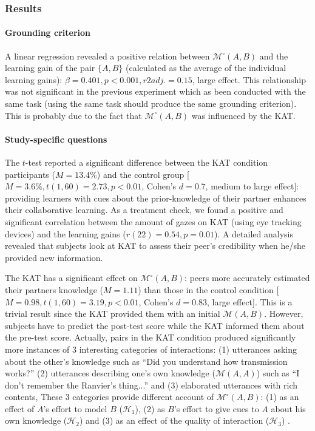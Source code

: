 \documentclass[natbib]{svjour3}
\newcommand{\gmodel}[2]{{$\mathcal{M}(#1, #2)$}}
\newcommand{\gModel}[2]{{$\mathcal{M}^{\circ}(#1, #2)$}}
\begin{document}
\subsubsection*{Results}

\paragraph{Grounding criterion} A linear regression revealed a positive relation
between \gModel{A}{B} and the learning gain of the pair $\{A, B\}$ (calculated
as the average of the individual learning gains): $\beta= 0.401, p < 0.001, r2adj.
= 0.15$, large effect. This relationship was not significant in the previous
experiment which as been conducted with the same task (using the same task
should produce the same grounding criterion). This is probably due to the fact that
\gModel{A}{B} was influenced by the KAT.

\paragraph{Study-specific questions} The $t$-test reported a significant
difference between the KAT condition participants ($M = 13.4\%$) and the control
group [$M = 3.6\%, t(1, 60) = 2.73, p < 0.01$, Cohen's $d = 0.7$, medium to large
effect]: providing learners with cues about the prior-knowledge of their partner
enhances their collaborative learning. As a treatment check, we found a positive
and significant correlation between the amount of gazes on KAT (using eye
tracking devices) and the learning gains ($r(22) = 0.54, p = 0.01$). A detailed
analysis revealed that subjects look at KAT to assess their peer's credibility
when he/she provided new information. 

The KAT has a significant effect on \gModel{A}{B}: peers more accurately
estimated their partners knowledge ($M = 1.11$) than those in the control
condition [$M = 0.98, t(1, 60) = 3.19, p < 0.01$, Cohen's $d = 0.83$, large
effect]. This is a trivial result since the KAT provided them with an initial
\gmodel{A}{B}. However, subjects have to predict the post-test score while the
KAT informed them about the pre-test score. Actually, pairs in the KAT condition
produced significantly more instances of 3 interesting categories of
interactions: (1) utterances asking about the other's knowledge such as ``Did
you understand how transmission works?'' (2) utterances describing one's own
knowledge (\gmodel{A}{A}) such as ``I don't remember the Ranvier's thing...''
and (3) elaborated utterances with rich contents,  These 3 categories provide
different account of \gModel{A}{B}: (1) as an effect of $A$'s effort to model
$B$  ($\mathcal{H}_{1}$), (2) as $B$'s effort to give cues to $A$ about his own
knowledge  ($\mathcal{H}_{2}$) and (3) as an effect of the quality of
interaction  ($\mathcal{H}_{3}$) .
\end{document}
